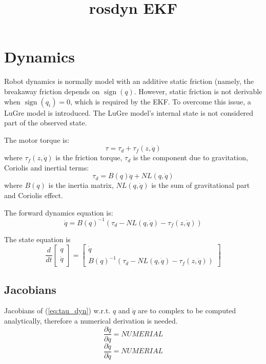 \documentclass{paper}
\DeclareMathOperator*{\sign}{sign}
\begin{document}
\title{rosdyn EKF}
\maketitle

\section{Dynamics}
Robot dynamics is normally model with an additive static friction (namely, the breakaway friction depends on $\sign(q)$.
However, static friction is not derivable when $\sign(q_i)=0$, which is required by the EKF.
To overcome this issue, a LuGre model is introduced. The LuGre model's internal state is not considered part of the observed state.

The motor torque is:
\begin{equation}
\tau=\tau_d+\tau_{f}(z,\dot{q})
\label{eq:tau}
\end{equation}
where $\tau_{f}(z,\dot{q})$ is the friction torque, $\tau_d$ is the component due to gravitation, Coriolis and inertial terms:
\begin{equation}
\tau_d=B(q)\ddot{q}+NL(q,\dot{q})
\label{eq:tau_dyn}
\end{equation}
where $B(q)$ is the inertia matrix, $NL(q,\dot{q})$ is the sum of gravitational part and Coriolis effect.

The forward dynamics equation is:
\begin{equation}
\ddot{q}=B(q)^{-1}\left(\tau_d-NL(q,\dot{q})-\tau_f(z,\dot{q})\right)
\end{equation}

The state equation is
\begin{equation}
\frac{d}{dt}\left[\begin{array}{c}
q\\
\dot{q}
\end{array}\right]
=
\left[\begin{array}{cc}
\dot{q}\\
B(q)^{-1}\left(\tau_d-NL(q,\dot{q})-\tau_f(z,\dot{q})\right)
\end{array}\right]
\end{equation}
\subsection{Jacobians}
Jacobians of (\ref{eq:tau_dyn}) w.r.t. $q$ and $\dot{q}$ are to complex to be computed analytically, therefore a numerical derivation is needed.
\begin{equation}
\frac{\partial\ddot{q}}{\partial q}=NUMERIAL
\end{equation}
\begin{equation}
\frac{\partial\ddot{q}}{\partial \dot{q}}=NUMERIAL
\end{equation}
\end{document}
